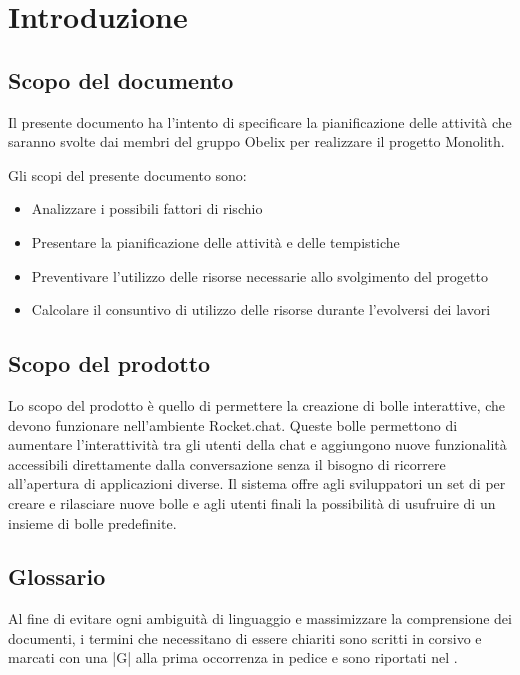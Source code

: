 \section{Introduzione}

\subsection{Scopo del documento}

Il presente documento ha l'intento di specificare la pianificazione delle attività che saranno svolte dai membri del gruppo Obelix per realizzare il progetto Monolith.

Gli scopi del presente documento sono:
\begin{itemize}
\item Analizzare i possibili fattori di rischio
\item Presentare la pianificazione delle attività e delle tempistiche
\item Preventivare l'utilizzo delle risorse necessarie allo svolgimento del progetto
\item Calcolare il consuntivo di utilizzo delle risorse durante l'evolversi dei lavori
\end{itemize}

\subsection{Scopo del prodotto}

Lo scopo del prodotto è quello di permettere la creazione di bolle
interattive, che devono funzionare nell'ambiente Rocket.chat. Queste
bolle permettono di aumentare l'interattività tra gli utenti della
chat e aggiungono nuove funzionalità accessibili
direttamente dalla conversazione senza il bisogno di ricorrere
all'apertura di applicazioni diverse.
Il sistema offre agli sviluppatori un set di  per creare e
rilasciare nuove bolle e agli utenti finali la possibilità di
usufruire di un insieme di bolle predefinite.

\subsection{Glossario}

Al fine di evitare ogni ambiguità di linguaggio e massimizzare la
comprensione dei documenti, i termini che necessitano di essere
chiariti sono scritti in corsivo e marcati con una |G| alla prima
occorrenza in pedice e
sono riportati nel \gloss.

